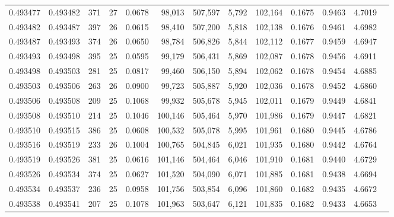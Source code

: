 \begin{tabular}{rrrrrrrrrrrrr}
0.493477 & 0.493482 & 371 &  27 &                                     0.0678 &  98,013 & 507,597 &   5,792 & 102,164 & 0.1675 & 0.9463 & 4.7019 \\
0.493482 & 0.493487 & 397 &  26 &                                     0.0615 &  98,410 & 507,200 &   5,818 & 102,138 & 0.1676 & 0.9461 & 4.6982 \\
0.493487 & 0.493493 & 374 &  26 &                                     0.0650 &  98,784 & 506,826 &   5,844 & 102,112 & 0.1677 & 0.9459 & 4.6947 \\
0.493493 & 0.493498 & 395 &  25 &                                     0.0595 &  99,179 & 506,431 &   5,869 & 102,087 & 0.1678 & 0.9456 & 4.6911 \\
0.493498 & 0.493503 & 281 &  25 &                                     0.0817 &  99,460 & 506,150 &   5,894 & 102,062 & 0.1678 & 0.9454 & 4.6885 \\
0.493503 & 0.493506 & 263 &  26 &                                     0.0900 &  99,723 & 505,887 &   5,920 & 102,036 & 0.1678 & 0.9452 & 4.6860 \\
0.493506 & 0.493508 & 209 &  25 &                                     0.1068 &  99,932 & 505,678 &   5,945 & 102,011 & 0.1679 & 0.9449 & 4.6841 \\
0.493508 & 0.493510 & 214 &  25 &                                     0.1046 & 100,146 & 505,464 &   5,970 & 101,986 & 0.1679 & 0.9447 & 4.6821 \\
0.493510 & 0.493515 & 386 &  25 &                                     0.0608 & 100,532 & 505,078 &   5,995 & 101,961 & 0.1680 & 0.9445 & 4.6786 \\
0.493516 & 0.493519 & 233 &  26 &                                     0.1004 & 100,765 & 504,845 &   6,021 & 101,935 & 0.1680 & 0.9442 & 4.6764 \\
0.493519 & 0.493526 & 381 &  25 &                                     0.0616 & 101,146 & 504,464 &   6,046 & 101,910 & 0.1681 & 0.9440 & 4.6729 \\
0.493526 & 0.493534 & 374 &  25 &                                     0.0627 & 101,520 & 504,090 &   6,071 & 101,885 & 0.1681 & 0.9438 & 4.6694 \\
0.493534 & 0.493537 & 236 &  25 &                                     0.0958 & 101,756 & 503,854 &   6,096 & 101,860 & 0.1682 & 0.9435 & 4.6672 \\
0.493538 & 0.493541 & 207 &  25 &                                     0.1078 & 101,963 & 503,647 &   6,121 & 101,835 & 0.1682 & 0.9433 & 4.6653 \\

\end{tabular}
